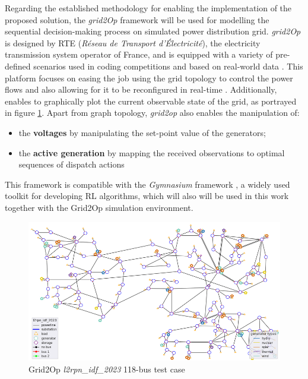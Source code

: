 Regarding the established methodology for enabling the implementation of the proposed solution, the \textit{grid2Op} framework \cite{rtefranceGrid2OpDocumentation} will be used for modelling the sequential decision-making process on simulated power distribution grid. \textit{grid2Op} is designed by RTE (\textit{Réseau de Transport d'Électricité}), the electricity transmission system operator of France, and is equipped with a variety of pre-defined scenarios used in coding competitions and based on real-world data \cite{rtefranceGrid2OpDocumentation}. This platform focuses on easing the job using the grid topology to control the power flows and also allowing for it to be reconfigured in real-time \cite{rtefranceGrid2OpDocumentation}. Additionally, enables to graphically plot the current observable state of the grid, as portrayed in figure \ref{fig:grid2op-graph}. Apart from graph topology, \textit{grid2op} also enables the manipulation of:

\begin{itemize}
\item the \textbf{voltages} by manipulating the set-point value of the generators;
\item the \textbf{active generation} by mapping the received observations to optimal sequences of dispatch actions \cite{rtefranceGrid2OpDocumentation}
\end{itemize}

This framework is compatible with the \textit{Gymnasium} framework \cite{faramafoundationGymnasiumDocumentation}, a widely used toolkit for developing \ac{RL} algorithms, which will also will be used in this work together with the Grid2Op simulation environment. 

\begin{figure}
	\centering
	\includegraphics[width=0.85\linewidth]{./figures/grid2op-graph.png}
	\caption{Grid2Op \textit{l2rpn\_idf\_2023} 118-bus test case \cite{rtefranceGrid2OpDocumentation}}
	\label{fig:grid2op-graph}
\end{figure}

